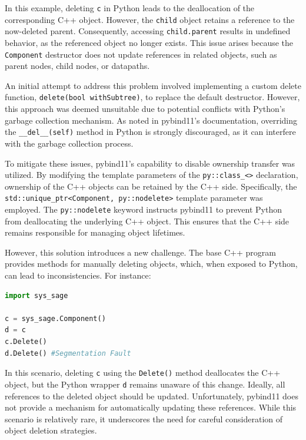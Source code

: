 In this example, deleting \verb|c| in Python leads to the deallocation of the corresponding C++ object. However, the \verb|child| object retains a reference to the now-deleted parent. Consequently, accessing \verb|child.parent| results in undefined behavior, as the referenced object no longer exists. This issue arises because the \verb|Component| destructor does not update references in related objects, such as parent nodes, child nodes, or datapaths.

An initial attempt to address this problem involved implementing a custom delete function, \verb|delete(bool withSubtree)|, to replace the default destructor. However, this approach was deemed unsuitable due to potential conflicts with Python's garbage collection mechanism. As noted in pybind11's documentation, overriding the \verb|__del__(self)| method in Python is strongly discouraged, as it can interfere with the garbage collection process. \cite[see Chapter 12]{python-gc}

To mitigate these issues, pybind11's capability to disable ownership transfer was utilized. By modifying the template parameters of the \verb|py::class_<>| declaration, ownership of the C++ objects can be retained by the C++ side. Specifically, the \verb|std::unique_ptr<Component, py::nodelete>| template parameter was employed. The \verb|py::nodelete| keyword instructs pybind11 to prevent Python from deallocating the underlying C++ object. This ensures that the C++ side remains responsible for managing object lifetimes.

However, this solution introduces a new challenge. The base C++ program provides methods for manually deleting objects, which, when exposed to Python, can lead to inconsistencies. For instance:
\newpage
  \begin{lstlisting}[language=Python, xleftmargin=4em, frame = single]
import sys_sage

c = sys_sage.Component()
d = c
c.Delete()
d.Delete() #Segmentation Fault
  \end{lstlisting}
  

In this scenario, deleting \verb|c| using the \verb|Delete()| method deallocates the C++ object, but the Python wrapper \verb|d| remains unaware of this change. Ideally, all references to the deleted object should be updated. Unfortunately, pybind11 does not provide a mechanism for automatically updating these references. While this scenario is relatively rare, it underscores the need for careful consideration of object deletion strategies.

